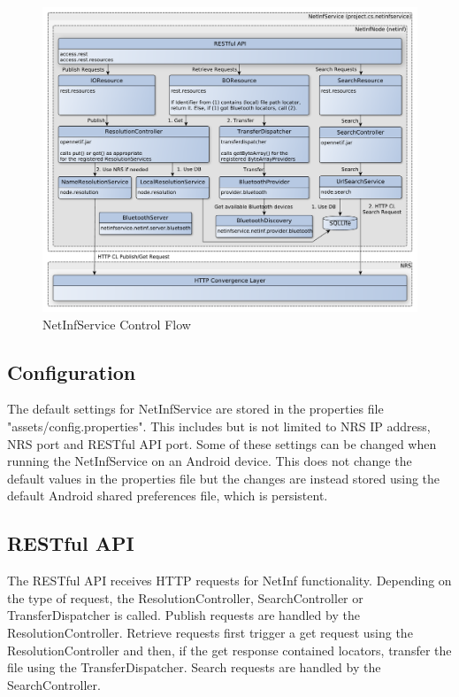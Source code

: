 \begin{figure}
\centering
\centerline{\includegraphics[width=1.4\textwidth]{./img/flowchart-NetInf.pdf}}
\caption{NetInfService Control Flow}
\label{fig:netinf-controlflow}
\end{figure}

\subsection{Configuration}
\label{sec:Configuration}

The default settings for NetInfService are stored in the properties file "assets/config.properties". This includes but is not limited to NRS IP address, NRS port and RESTful API port. Some of these settings can be changed when running the NetInfService on an Android device. This does not change the default values in the properties file but the changes are instead stored using the default Android shared preferences file, which is persistent.

\subsection{RESTful API}
\label{sec:RESTful API}

The RESTful API receives HTTP requests for NetInf functionality. Depending on the type of request, the ResolutionController, SearchController or TransferDispatcher is called. Publish requests are handled by the ResolutionController. Retrieve requests first trigger a get request using the ResolutionController and then, if the get response contained locators, transfer the file using the TransferDispatcher. Search requests are handled by the SearchController.

